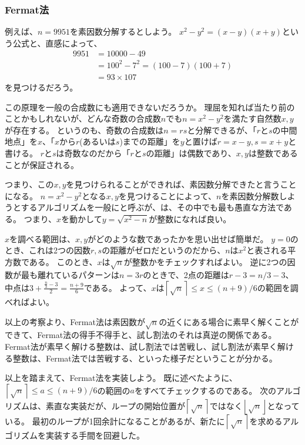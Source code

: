 \subsubsection{Fermat法}
例えば、$n=9951$を素因数分解するとしよう。
$x^2-y^2 = (x-y)(x+y)$という公式と、直感によって、
\begin{align*}
9951 &= 10000 - 49\\
&= 100^2 - 7^2 = (100 - 7)(100 + 7)\\
&= 93 \times 107
\end{align*}
を見つけるだろう。

この原理を一般の合成数にも適用できないだろうか。
理屈を知れば当たり前のことかもしれないが、どんな奇数の合成数$n$でも$n=x^2-y^2$を満たす自然数$x,y$が存在する。
というのも、奇数の合成数は$n=rs$と分解できるが、「$r$と$s$の中間地点」を$x$、「$x$から$r$(あるいは$s$)までの距離」を$y$と置けば$r=x-y,s=x+y$と書ける。
$r$と$s$は奇数なのだから「$r$と$s$の距離」は偶数であり、$x,y$は整数であることが保証される。

つまり、この$x,y$を見つけられることができれば、素因数分解できたと言うことになる。
$n=x^2-y^2$となる$x,y$を見つけることによって、$n$を素因数分解数しようとするアルゴリズムを一般にと呼ぶが、は、その中でも最も愚直な方法である。
つまり、$x$を動かして$y=\sqrt{x^2-n}$が整数になれば良い。

$x$を調べる範囲は、$x,y$がどのような数であったかを思い出せば簡単だ。
$y=0$のとき、これは2つの因数$r,s$の距離がゼロだというのだから、$n$は$x^2$と表される平方数である。
このとき、$x$は$\sqrt{n}$が整数かをチェックすればよい。
逆に2つの因数が最も離れているパターンは$n=3r$のときで、2点の距離は$r-3=n/3-3$、中点は$3+\frac{\frac{n}{3}-3}{2}=\frac{n+9}{6}$である。
よって、$x$は$\left \lceil\sqrt{n}\right \rceil\le x \le (n + 9) / 6$の範囲を調べればよい。

以上の考察より、Fermat法は素因数が$\sqrt{n}$の近くにある場合に素早く解くことができて、Fermat法の得手不得手と、試し割法のそれは真逆の関係である。
Fermat法が素早く解ける整数は、試し割法では苦戦し、試し割法が素早く解ける整数は、Fermat法では苦戦する、といった様子だということが分かる。

以上を踏まえて、Fermat法を実装しよう。
既に述べたように、$\left \lceil\sqrt{n}\right \rceil \le a \le (n + 9) / 6$の範囲の$a$をすべてチェックするのである。
次のアルゴリズムは、素直な実装だが、ループの開始位置が$\left \lceil\sqrt{n}\right \rceil$ではなく$\left \lfloor\sqrt{n}\right \rfloor$となっている。
最初のループが1回余計になることがあるが、新たに$\left \lceil\sqrt{n}\right \rceil$を求めるアルゴリズムを実装する手間を回避した。

